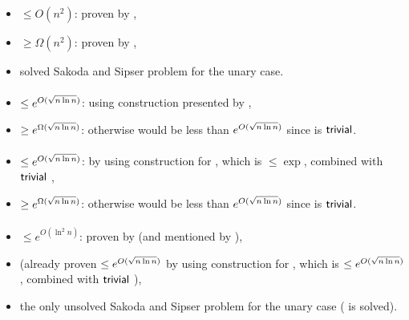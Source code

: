 \paragraph{\ONFA{}\tto\TDFA}\label{cost:1NFAto2DFAu}
\begin{itemize}
	\item $\le O(n^2)$: proven by ,
	\item $\ge \Omega(n^2)$: proven by ,
	\item solved Sakoda and Sipser problem for the unary case.
\end{itemize}
\paragraph{\TNFA{}\tto\ODFA}\label{cost:2NFAto1DFAu}
\begin{itemize}
	\item $\le e^{O(\sqrt{n\ln n})}$: using construction presented by ,
	\item $\ge e^{\Omega(\sqrt{n\ln n})}$: otherwise \hyperref[cost:2DFAto1DFAu]{\TDFA{}\tto\ODFA} would be less than $e^{O(\sqrt{n\ln n})}$ since \TDFA{}\tto\TNFA is $\mathsf{trivial}$.
\end{itemize}
\paragraph{\TNFA{}\tto\ONFA}
\begin{itemize}
	\item $\le e^{O(\sqrt{n\ln n})}$: by using construction for \hyperref[cost:2NFAto1DFAu]{\TNFA{}\tto\ODFA}, which is $\le\exp$, combined with $\mathsf{trivial}$ \ODFA{}\tto\ONFA,
	\item $\ge e^{\Omega(\sqrt{n\ln n})}$: otherwise \hyperref[cost:2DFAto1NFAu]{\TDFA{}\tto\ONFA} would be less than $e^{O(\sqrt{n\ln n})}$ since \TDFA{}\tto\TNFA is $\mathsf{trivial}$.
\end{itemize}
\paragraph{\TNFA{}\tto\TDFA}\label{cost:2NFAto2DFAu}
\begin{itemize}
	\item $\le e^{O(\ln^2n)}$: proven by  (and mentioned by ),
	\item (already proven $\le e^{O(\sqrt{n\ln n})}$ by using construction for \hyperref[cost:2NFAto1DFAu]{\TNFA{}\tto\ODFA}, which is $\le e^{O(\sqrt{n\ln n})}$, combined with $\mathsf{trivial}$ \ODFA{}\tto\TDFA),
	\item the only unsolved Sakoda and Sipser problem for the unary case (\hyperref[cost:1NFAto2DFAu]{\ONFA{}\tto\TDFA} is solved).
\end{itemize}


